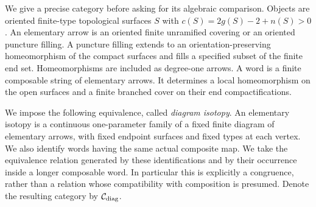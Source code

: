 We give a precise category before asking for its algebraic comparison.
Objects are oriented finite-type topological surfaces $S$ with
$c(S)=2g(S)-2+n(S)>0$. An elementary arrow is an oriented finite
unramified covering or an oriented puncture filling. A puncture
filling extends to an orientation-preserving homeomorphism of the
compact surfaces and fills a specified subset of the finite end set.
Homeomorphisms are included as degree-one arrows. A word is a
finite composable string of elementary arrows. It determines a
local homeomorphism on the open surfaces and a finite branched
cover on their end compactifications.

We impose the following equivalence, called \emph{diagram isotopy}.
An elementary isotopy is a continuous one-parameter family of a
fixed finite diagram of elementary arrows, with fixed endpoint
surfaces and fixed types at each vertex. We also identify words
having the same actual composite map. We take the equivalence
relation generated by these identifications and by their occurrence
inside a longer composable word. In particular this is explicitly
a congruence, rather than a relation whose compatibility with
composition is presumed. Denote the resulting category by
$\mathcal C_{\rm diag}$.

